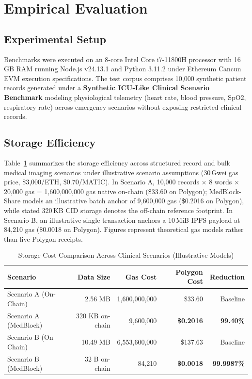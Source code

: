 \documentclass[journal,10pt,twocolumn]{IEEEtran}
\begin{document}
\section{Empirical Evaluation}

\subsection{Experimental Setup}
Benchmarks were executed on an 8-core Intel Core i7-11800H processor with 16\,GB RAM running Node.js v24.13.1 and Python 3.11.2 under Ethereum Cancun EVM execution specifications. The test corpus comprises 10,000 synthetic patient records generated under a \textbf{Synthetic ICU-Like Clinical Scenario Benchmark} modeling physiological telemetry (heart rate, blood pressure, SpO2, respiratory rate) across emergency scenarios without exposing restricted clinical records.

\subsection{Storage Efficiency}
Table~\ref{tab:storage_cost} summarizes the storage efficiency across structured record and bulk medical imaging scenarios under illustrative scenario assumptions (30\,Gwei gas price, \$3,000/ETH, \$0.70/MATIC). In Scenario A, 10,000 records $\times$ 8 words $\times$ 20,000 gas = 1,600,000,000 gas native on-chain (\$33.60 on Polygon); MedBlock-Share models an illustrative batch anchor of 9,600,000 gas (\$0.2016 on Polygon), while stated 320\,KB CID storage denotes the off-chain reference footprint. In Scenario B, an illustrative single transaction anchors a 10\,MiB IPFS payload at 84,210 gas (\$0.0018 on Polygon). Figures represent theoretical gas models rather than live Polygon receipts.

\begin{table}[h]
\caption{Storage Cost Comparison Across Clinical Scenarios (Illustrative Models)}
\label{tab:storage_cost}
\centering
\begin{tabular}{lrrrr}
\toprule
\textbf{Scenario} & \textbf{Data Size} & \textbf{Gas Cost} & \textbf{Polygon Cost} & \textbf{Reduction} \\
\midrule
Scenario A (On-Chain) & 2.56 MB & 1,600,000,000 & \$33.60 & Baseline \\
Scenario A (MedBlock) & 320 KB on-chain & 9,600,000 & \textbf{\$0.2016} & \textbf{99.40\%} \\
\midrule
Scenario B (On-Chain) & 10.49 MB & 6,553,600,000 & \$137.63 & Baseline \\
Scenario B (MedBlock) & 32 B on-chain & 84,210 & \textbf{\$0.0018} & \textbf{99.9987\%} \\
\bottomrule
\end{tabular}
\end{table}
\end{document}
